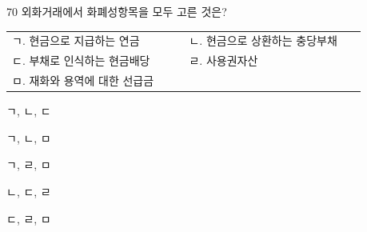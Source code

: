 \begin{question}{70}
외화거래에서 화폐성항목을 모두 고른 것은?
\begin{tcolorbox}[enhanced, colback=white, colframe=black, boxrule=0.4pt, arc=0pt, left=4pt, right=4pt, top=4pt, bottom=4pt]
\begin{tabular}{@{}p{0.45\linewidth}p{0.45\linewidth}@{}}
ㄱ. 현금으로 지급하는 연금 & ㄴ. 현금으로 상환하는 충당부채 \\
ㄷ. 부채로 인식하는 현금배당 & ㄹ. 사용권자산 \\
ㅁ. 재화와 용역에 대한 선급금 &
\end{tabular}
\end{tcolorbox}
\begin{choices}
  \item ㄱ, ㄴ, ㄷ
  \item ㄱ, ㄴ, ㅁ
  \item ㄱ, ㄹ, ㅁ
  \item ㄴ, ㄷ, ㄹ
  \item ㄷ, ㄹ, ㅁ
\end{choices}
\end{question}
